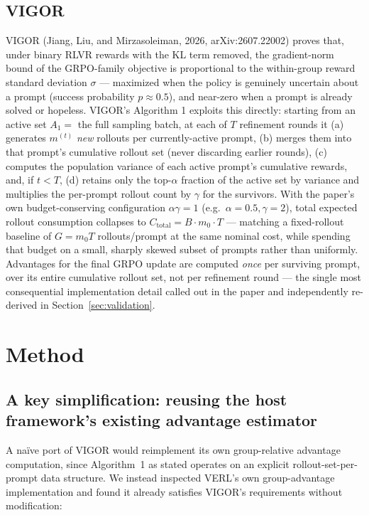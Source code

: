 \documentclass[11pt]{article}
\begin{document}
\subsection{VIGOR}

VIGOR (Jiang, Liu, and Mirzasoleiman, 2026, arXiv:2607.22002) proves that, under
binary RLVR rewards with the KL term removed, the gradient-norm bound of the
GRPO-family objective is proportional to the within-group reward standard deviation
$\sigma$ — maximized when the policy is genuinely uncertain about a prompt (success
probability $p\approx 0.5$), and near-zero when a prompt is already solved or
hopeless. VIGOR's Algorithm 1 exploits this directly: starting from an active set
$A_1 = $ the full sampling batch, at each of $T$ refinement rounds it (a) generates
$m^{(t)}$ \emph{new} rollouts per currently-active prompt, (b) merges them into that
prompt's cumulative rollout set (never discarding earlier rounds), (c) computes the
population variance of each active prompt's cumulative rewards, and, if
$t<T$, (d) retains only the top-$\alpha$ fraction of the active set by variance and
multiplies the per-prompt rollout count by $\gamma$ for the survivors. With the
paper's own budget-conserving configuration $\alpha\gamma = 1$ (e.g.\ $\alpha=0.5,
\gamma=2$), total expected rollout consumption collapses to $C_{\text{total}} =
B\cdot m_0\cdot T$ — matching a fixed-rollout baseline of $G=m_0 T$ rollouts/prompt
at the same nominal cost, while spending that budget on a small, sharply skewed
subset of prompts rather than uniformly. Advantages for the final GRPO update are
computed \emph{once} per surviving prompt, over its entire cumulative rollout set,
not per refinement round — the single most consequential implementation detail
called out in the paper and independently re-derived in Section~\ref{sec:validation}.

\section{Method}
\label{sec:method}

\subsection{A key simplification: reusing the host framework's existing advantage estimator}
\label{sec:simplification}

A na\"ive port of VIGOR would reimplement its own group-relative advantage
computation, since Algorithm~1 as stated operates on an explicit
rollout-set-per-prompt data structure. We instead inspected VERL's own
group-advantage implementation and found it already satisfies VIGOR's requirements
without modification:
\end{document}
